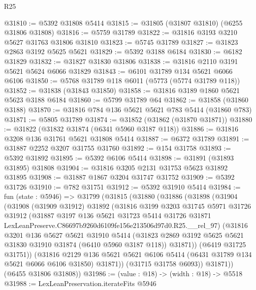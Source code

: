 \begin{lexlean}{R25}
\begin{coremodule}
@31810 := @5392 @31808 @5414
@31815 := @31805 (@31807 @31810) (@6255 @31806 @31808)
@31816 := @5759 @31789
@31822 := @31816 @3193 @3210 @5627 @31763 @31806 @31810
@31823 := @5745 @31789
@31827 := @31823 @2863 @3192 @5625 @5621
@31829 := @5392 @3188 @6184
@31830 := @6182 @31829
@31832 := @31827 @31830 @31806
@31838 := @31816 @2110 @3191 @5621 @5624 @6066 @31829
@31843 := @6101 @31789 @134 @5621 @6066 @6106
@31850 := @5768 @31789 @118 @6011 (@5773 (@5774 @31789 @118))
@31852 := @31838 (@31843 @31850)
@31858 := @31816 @3189 @1860 @5621 @5623 @3188 @6184
@31860 := @5799 @31789 @64
@31862 := @31858 (@31860 @3188)
@31870 := @31816 @784 @136 @5621 @5621 @783 @5414 (@31860 @783)
@31871 := @5805 @31789
@31874 := @31852 (@31862 (@31870 @31871))
@31880 := @31822 (@31832 @31874 (@6341 @5960 @3187 @118))
@31886 := @31816 @3208 @136 @31761 @5621 @31808 @5414
@31887 := @6372 @31789
@31891 := @31887 @2252 @3207 @31755 @31760
@31892 := @154 @31758
@31893 := @5392 @31892
@31895 := @5392 @6106 @5414
@31898 := @31891 (@31893 @31895) @31808
@31904 := @31816 @3205 @2131 @31753 @5623 @31892 @31895
@31908 := @31887 @1867 @3204 @31747 @31752
@31909 := @5392 @31726
@31910 := @782 @31751
@31912 := @5392 @31910 @5414
@31984 := fun (state : @5946) =>
  @31799
    (@31815
      (@31880
        (@31886
          (@31898
            (@31904
              (@31908
                (@31909 @31912)
                @31892
                (@31816
                  @3199
                  @3203
                  @31745
                  @5971
                  @31726
                  @31912
                  (@31887
                    @3197
                    @136
                    @5621
                    @31723
                    @5414
                    @31726
                    @31871
                    LexLeanPreserve.C86697b9260d6109fe156e213506d97d0.R25.__rel_97)
                  (@31816
                    @3201
                    @136
                    @5627
                    @5621
                    @31910
                    @5414
                    (@31823 @2869 @3192 @5625 @5621 @31830 @31910 @31874 (@6410 @5960 @3187 @118))
                    @31871))
                (@6419 @31725 @31751))
              (@31816
                @2129
                @136
                @5621
                @5621
                @6106
                @5414
                (@6431 @31789 @134 @5621 @6066 @6106 @31850)
                @31871))
            (@31715 @31758 @6093))
          @31871))
      (@6455 @31806 @31808))
@31986 := (value : @18) -> (width : @18) -> @5518
@31988 := LexLeanPreservation.iterateFits @5946

\end{coremodule}
\end{lexlean}
